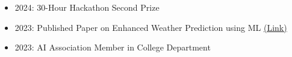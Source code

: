 \documentclass[10pt,a4paper,ragged2e,withhyper]{altacv}
\begin{document}
\begin{paracol}{2}
\divider


\divider


\begin{itemize}
    \item 2024: 30-Hour Hackathon Second Prize
    \item 2023: Published Paper on Enhanced Weather Prediction using ML \href{https://github.com/silentFellow/weatherPrediction.git}{(Link)}
    \item 2023: AI Association Member in College Department
\end{itemize}


\end{paracol}
\end{document}
